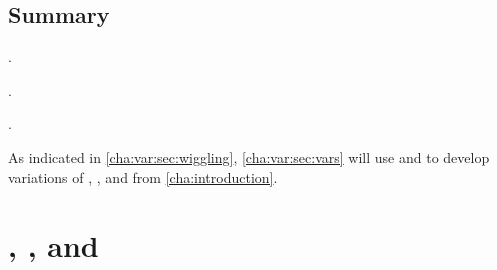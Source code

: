 


\subsection{Summary}
\label{cha:var:ros:summary}

\begin{note}
  \supportI{}.

  .

  \supportII{}.
\end{note}

\begin{note}
  As indicated in \autoref{cha:var:sec:wiggling}, \autoref{cha:var:sec:vars} will use  and  to develop variations of \qWhy{}, \qHow{}, and \issueInclusion{} from \autoref{cha:introduction}.
\end{note}


\section{\qWhyV{}, \qHowV{}, and \issueConstraint{}}
\label{cha:var:sec:vars}

